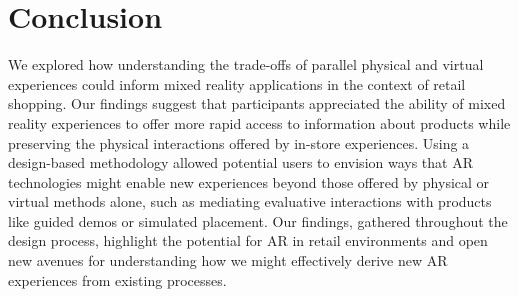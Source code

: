 \section{Conclusion}
We explored how understanding the trade-offs of parallel physical and virtual experiences could inform mixed reality applications in the context of retail shopping. Our findings suggest that participants appreciated the ability of mixed reality experiences to offer more rapid access to information about products while preserving the physical interactions offered by in-store experiences. Using a design-based methodology allowed potential users to envision ways that AR technologies might enable new experiences beyond those offered by physical or virtual methods alone, such as mediating evaluative interactions with products like guided demos or simulated placement.  
Our findings, gathered throughout the design process, highlight the potential for AR in retail environments and open new avenues for understanding how we might effectively derive new AR experiences from existing processes.